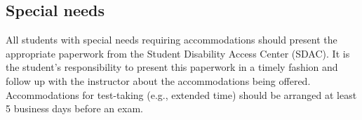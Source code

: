 \documentclass[oneside,11pt]{amsart}
\begin{document}
\subsection{Special needs}

All students with special needs requiring accommodations should present the
appropriate paperwork from the Student Disability Access Center (SDAC). It is
the student's responsibility to present this paperwork in a timely fashion and
follow up with the instructor about the accommodations being offered.
Accommodations for test-taking (e.g., extended time) should be arranged at
least 5 business days before an exam.
\end{document}
